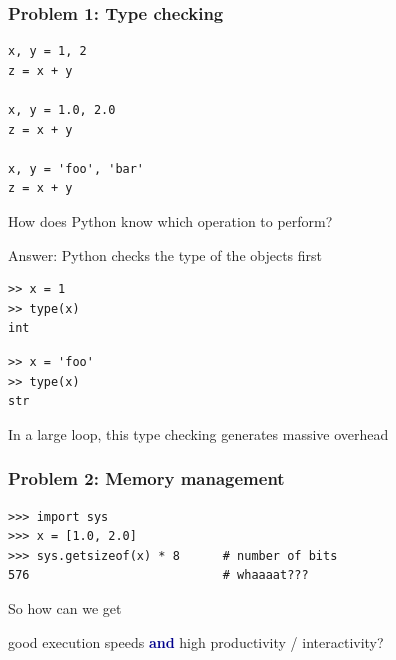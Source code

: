 \documentclass[
    xcolor={svgnames,dvipsnames},
    hyperref={colorlinks, citecolor=DeepPink4, linkcolor=DarkRed, urlcolor=DarkBlue}
    ]{beamer}  %
\newcommand{\navy}[1]{\textcolor{DarkBlue}{\bf #1}}
\newcommand{\1}{\mathbbm 1}
\begin{document}
\begin{frame}[fragile]
    \frametitle{Problem 1: Type checking}

    \begin{verbatim}
x, y = 1, 2
z = x + y       

x, y = 1.0, 2.0
z = x + y      

x, y = 'foo', 'bar'
z = x + y     
    \end{verbatim}

    \vspace{0.5em}
    \vspace{0.5em}

How does Python know which operation to perform?

\end{frame}


\begin{frame}[fragile]

    Answer: Python checks the type of the objects first

    \begin{verbatim}
>> x = 1
>> type(x)
int
    \end{verbatim}

    \begin{verbatim}
>> x = 'foo'
>> type(x)
str
    \end{verbatim}


    In a large loop, this type checking generates massive overhead
\end{frame}


\begin{frame}[fragile]
    \frametitle{Problem 2: Memory management}

    \begin{verbatim}
>>> import sys
>>> x = [1.0, 2.0]
>>> sys.getsizeof(x) * 8      # number of bits
576                           # whaaaat???
    \end{verbatim}


\end{frame}


\begin{frame}
    
    So how can we get 

    \begin{center}
    good execution speeds \navy{and} high productivity / interactivity?
    \end{center}

\end{frame}
\end{document}
